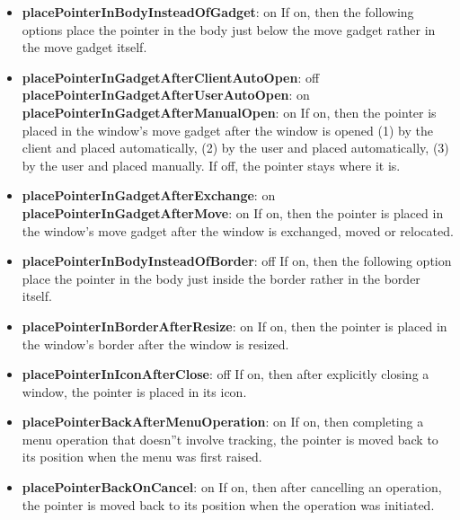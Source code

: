 \begin{itemize}
\item {\bf placePointerInBodyInsteadOfGadget}: on\newline{}
If on, then the following options place the pointer in the body
just below the move gadget rather in the move gadget itself.

\item {\bf placePointerInGadgetAfterClientAutoOpen}: off\newline{}
{\bf placePointerInGadgetAfterUserAutoOpen}: on\newline{}
{\bf placePointerInGadgetAfterManualOpen}: on\newline{}
If on, then the pointer is placed in the window's move gadget
after the window is opened (1) by the client and placed
automatically, (2) by the user and placed automatically,
(3) by the user and placed manually.  If off, the pointer stays
where it is.

\item {\bf placePointerInGadgetAfterExchange}: on\newline{}
{\bf placePointerInGadgetAfterMove}: on\newline{}
If on, then the pointer is placed in the window's move gadget
after the window is exchanged, moved or relocated.

\item {\bf placePointerInBodyInsteadOfBorder}: off\newline{}
If on, then the following option place the pointer in the body
just inside the border rather in the border itself.

\item {\bf placePointerInBorderAfterResize}: on\newline{}
If on, then the pointer is placed in the window's border
after the window is resized.

\item {\bf placePointerInIconAfterClose}: off\newline{}
If on, then after explicitly closing a window, the pointer is
placed in its icon.

\item {\bf placePointerBackAfterMenuOperation}: on\newline{}
If on, then completing a menu operation that doesn''t involve
tracking, the pointer is moved back to its position when the
menu was first raised.

\item {\bf placePointerBackOnCancel}: on\newline{}
If on, then after cancelling an operation, the pointer is moved
back to its position when the operation was initiated.


\end{itemize}
